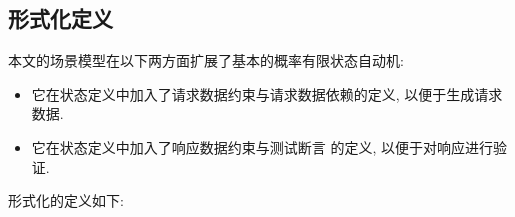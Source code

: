         \subsection{形式化定义}
            本文的场景模型在以下两方面扩展了基本的概率有限状态自动机:
            
            \begin{itemize}
                \item 它在状态定义中加入了请求数据约束与请求数据依赖的定义, 以便于生成请求数据.
                
                \item 它在状态定义中加入了响应数据约束与测试断言 的定义, 以便于对响应进行验证.
            \end{itemize}
            
            形式化的定义如下:
            
